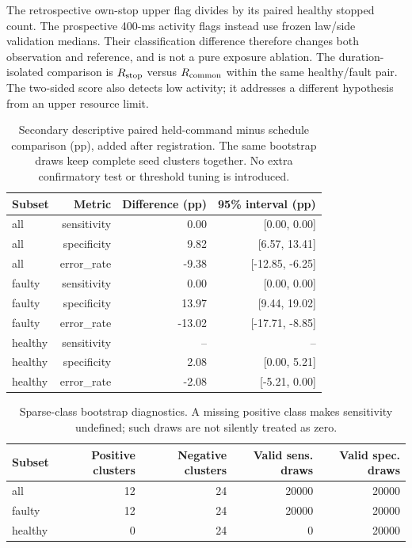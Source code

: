 \documentclass[10pt,letterpaper]{article}
\begin{document}
The retrospective own-stop upper flag divides by its paired healthy stopped count. The prospective 400-ms activity flags instead use frozen law/side validation medians. Their classification difference therefore changes both observation and reference, and is not a pure exposure ablation. The duration-isolated comparison is $R_{\rm stop}$ versus $R_{\rm common}$ within the same healthy/fault pair. The two-sided score also detects low activity; it addresses a different hypothesis from an upper resource limit.

\begin{table}[H]
\centering\small
\caption{Secondary descriptive paired held-command minus schedule comparison (pp), added after registration. The same bootstrap draws keep complete seed clusters together. No extra confirmatory test or threshold tuning is introduced.}
\begin{tabular}{lrrr}
\toprule
Subset & Metric & Difference (pp) & 95\% interval (pp)\\
\midrule
all & sensitivity & 0.00 & [0.00, 0.00]\\
all & specificity & 9.82 & [6.57, 13.41]\\
all & error\_rate & -9.38 & [-12.85, -6.25]\\
faulty & sensitivity & 0.00 & [0.00, 0.00]\\
faulty & specificity & 13.97 & [9.44, 19.02]\\
faulty & error\_rate & -13.02 & [-17.71, -8.85]\\
healthy & sensitivity & -- & --\\
healthy & specificity & 2.08 & [0.00, 5.21]\\
healthy & error\_rate & -2.08 & [-5.21, 0.00]\\
\bottomrule
\end{tabular}
\end{table}

\begin{table}[H]
\centering\small
\caption{Sparse-class bootstrap diagnostics. A missing positive class makes sensitivity undefined; such draws are not silently treated as zero.}
\begin{tabular}{lrrrr}
\toprule
Subset & Positive clusters & Negative clusters & Valid sens. draws & Valid spec. draws\\
\midrule
all & 12 & 24 & 20000 & 20000\\
faulty & 12 & 24 & 20000 & 20000\\
healthy & 0 & 24 & 0 & 20000\\
\bottomrule
\end{tabular}
\end{table}
\end{document}
